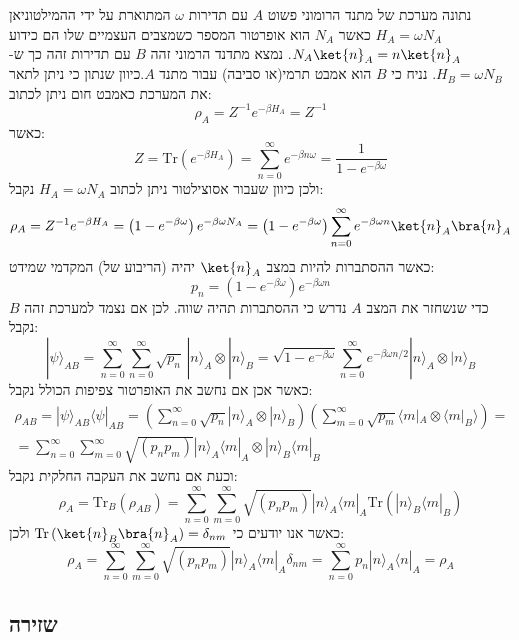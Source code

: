 \documentclass{tstextbook}
\begin{document}
\begin{example}
נתונה מערכת של מתנד הרומוני פשוט \(A\) עם תדירות \(\omega\) המתוארת על ידי ההמילטוניאן \(H_{A}=\omega N_{A}\) כאשר \(N_{A}\) הוא אופרטור המספר כשמצבים העצמיים שלו הם כידוע \(N_{A}\ket{n}_{A}=n\ket{n}_{A}\). נמצא מתדנד הרמוני זהה \(B\) עם תדירות זהה כך ש-\(H_{B}=\omega N_{B}\). נניח כי \(B\) הוא אמבט תרמי(או סביבה) עבור מתנד \(A\).כיוון שנתון כי ניתן לתאר את המערכת כאמבט חום ניתן לכתוב:
$$\rho_{A}=Z^{-1} e^{ -\beta H_{A} } =Z^{-1}$$
כאשר:
$$Z=\mathrm{Tr}\left( e^{ -\beta H_{A} } \right)=\sum_{n=0}^{\infty} e^{ -\beta n\omega }= \frac{1}{1-e^{ -\beta \omega }}$$
ולכן כיוון שעבור אסוצילטור ניתן לכתוב \(H_{A}=\omega N_{A}\) נקבל:
$$\rho_{A}=Z^{-1}e^{-\beta H_{A}}=\left( 1-e^{ -\beta \omega } \right)e^{ -\beta \omega N_{A} }=\left( 1-e^{ -\beta \omega } \right)\sum_{n=0}^{\infty} e^{ -\beta \omega n }\ket{n} _{A}\bra{n} _{A}$$
כאשר ההסתברות להיות במצב \(\ket{n}_{A}\) יהיה (הריבוע של) המקדמי שמידט:
$$p_{n}=\left(1-e^{-\beta\omega}\right)e^{-\beta\omega n}$$
כדי שנשחזר את המצב \(A\) נדרש כי ההסתברות תהיה שווה. לכן אם נצמד למערכת זהה \(B\) נקבל:
$$|\psi\rangle_{A B}=\sum_{n=0}^{\infty}\sum_{n=0}^{\infty}{\sqrt{p_{n}}}\,|n\rangle_{A}\otimes|n\rangle_{B}={\sqrt{1-e^{-\beta\omega}}}\sum_{n=0}^{\infty}e^{-\beta\omega n/2}|n\rangle_{A}\otimes|n\rangle_{B}$$
כאשר אכן אם נחשב את האופרטור צפיפות הכולל נקבל:
$$\begin{gather}\rho_{AB}=|\psi\rangle_{AB}\langle\psi|_{AB}=(\sum_{n=0}^{\infty}\sqrt{p_{n}}|n\rangle_{A}\otimes|n\rangle_{B})(\sum_{m=0}^{\infty}\sqrt{p_{m}}\langle m|_{A}\otimes\langle m|_{B}\rangle)=\\=\sum_{n=0}^{\infty}\sum_{m=0}^{\infty}\sqrt{(p_{n}p_{m})}|n\rangle_{A}\langle m|_{A}\otimes|n\rangle_{B}\langle m|_{B} 
\end{gather}$$
וכעת אם נחשב את העקבה החלקית נקבל:
$$\rho_{A}=\mathrm{Tr}_{B}(\rho_{A B})=\sum_{n=0}^{\infty}\sum_{m=0}^{\infty}\sqrt{(p_{n}p_{m})}|n\rangle_{A}\langle m|_{A}\mathrm{Tr}(|n\rangle_{B}\langle m|_{B})$$
כאשר אנו יודעים כי \(\mathrm{Tr}\left( \ket{n}_{B}\bra{n}_{A} \right)=\delta_{nm}\) ולכן:
$$\rho_{A}=\sum_{n=0}^{\infty}\sum_{m=0}^{\infty}\sqrt{(p_{n}p_{m})}|n\rangle_{A}\langle m|_{A}\delta_{n m}=\sum_{n=0}^{\infty}p_{n}|n\rangle_{A}\langle n|_{A}=\rho_{A}$$

\end{example}
\subsection{שזירה}
\end{document}
